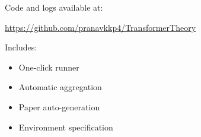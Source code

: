 \documentclass[conference]{IEEEtran}
\begin{document}
Code and logs available at:

\begin{center}
\url{https://github.com/pranavkkp4/TransformerTheory}
\end{center}

Includes:
\begin{itemize}
\item One-click runner
\item Automatic aggregation
\item Paper auto-generation
\item Environment specification
\end{itemize}

\nocite{*}


\end{document}
